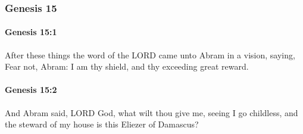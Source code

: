 	\subsubsection{Genesis 15} %
		\label{GENESIS-15}

		\paragraph{Genesis 15:1} %
			\label{GENESIS-15-1}

			After these things the word of the LORD came unto Abram in a vision, saying, Fear not, Abram: I am thy shield, and thy exceeding great reward.


		\paragraph{Genesis 15:2} %
			\label{GENESIS-15-2}

			And Abram said, LORD God, what wilt thou give me, seeing I go childless, and the steward of my house is this Eliezer of Damascus?

